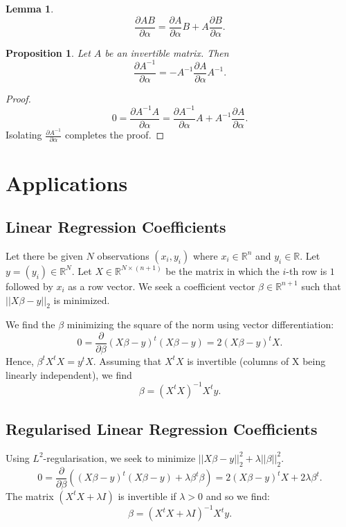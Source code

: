 \documentclass{article}
\theoremstyle{plain}
\newtheorem{lemma}[theorem]{Lemma}
\newtheorem{proposition}[theorem]{Proposition}
\newcommand{\diff}[2]{\frac{\partial {#1}}{\partial {#2}}}
\newcommand{\R}{\mathbb{R}}
\begin{document}
\begin{lemma}
\begin{equation}
\diff{AB}{\alpha} = \diff{A}{\alpha} B + A \diff{B}{\alpha}.
\end{equation}
\end{lemma}

\begin{proposition}
Let $A$ be an invertible matrix. Then
\begin{equation}
\diff{A^{-1}}{\alpha} = - A^{-1} \diff{A}{\alpha} A^{-1}.
\end{equation}
\end{proposition}
\begin{proof}
\begin{equation*}
0 = \diff{A^{-1} A}{\alpha} = \diff{A^{-1}}{\alpha} A + A^{-1} \diff{A}{\alpha}.
\end{equation*}
Isolating $\diff{A^{-1}}{\alpha}$ completes the proof.
\end{proof}


\section{Applications}
\subsection{Linear Regression Coefficients}
Let there be given $N$ observations $(x_i, y_i)$ where $x_i \in \R^n$ and $y_i \in \R$. Let $y = (y_i) \in \R^N$. Let $X \in \R^{N \times (n+1)}$ be the matrix in which the $i$-th row is $1$ followed by $x_i$ as a row vector. We seek a coefficient vector $\beta \in \R^{n+1}$ such that $\lvert\lvert X \beta - y \rvert\rvert_2$ is minimized.

We find the $\beta$ minimizing the square of the norm using vector differentiation:
\begin{equation}
0 = \diff{}{\beta} (X \beta - y)^t (X \beta - y) = 2 (X \beta - y)^t X.
\end{equation}
Hence, $\beta^t X^t X = y^t X$. Assuming that $X^t X$ is invertible (columns of X being linearly independent), we find
\begin{equation}
\beta = (X^t X)^{-1} X^t y.
\end{equation}

\subsection{Regularised Linear Regression Coefficients}
Using $L^2$-regularisation, we seek to minimize $\lvert\vert X \beta - y \rvert\rvert_2^2 + \lambda \lvert\lvert \beta \rvert\rvert_2^2$. 
\begin{equation*}
0 = \diff{}{\beta} \left( (X \beta - y)^t (X\beta - y) + \lambda \beta^t \beta \right) = 2 (X \beta - y)^t X + 2 \lambda \beta^t.
\end{equation*}
The matrix $(X^t X + \lambda I)$ is invertible if $\lambda > 0$ and so we find:
\begin{equation*}
\beta = (X^t X + \lambda I)^{-1} X^t y.
\end{equation*}
\end{document}
